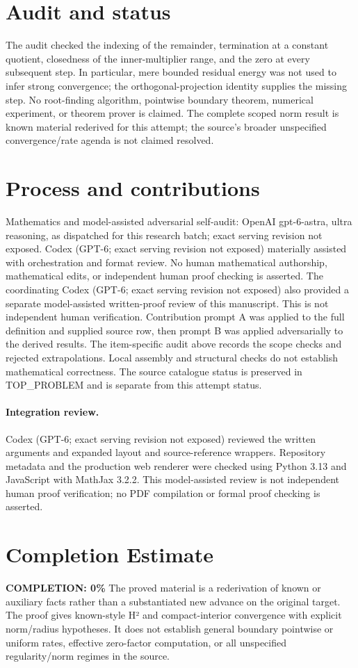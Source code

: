 \documentclass[11pt]{article}
\begin{document}
\section{Audit and status}
The audit checked the indexing of the remainder, termination at
a constant quotient, closedness of the inner-multiplier range,
and the zero at every subsequent step. In particular, mere
bounded residual energy was not used to infer strong convergence;
the orthogonal-projection identity supplies the missing step.
No root-finding algorithm, pointwise boundary theorem, numerical
experiment, or theorem prover is claimed. The complete scoped
norm result is known material rederived for this attempt; the
source's broader unspecified convergence/rate agenda is not
claimed resolved.

\section{Process and contributions}
Mathematics and model-assisted adversarial self-audit: OpenAI gpt-6-astra, ultra reasoning, as dispatched for this research batch; exact serving revision not exposed. Codex (GPT-6; exact serving revision not exposed) materially assisted with orchestration and format review. No human mathematical authorship, mathematical edits, or independent human proof checking is asserted.
The coordinating Codex (GPT-6; exact serving revision not exposed) also provided a separate model-assisted written-proof review of this manuscript. This is not independent human verification.
Contribution prompt A was applied to the full definition and supplied source row, then prompt B was applied adversarially to the derived results. The item-specific audit above records the scope checks and rejected extrapolations. Local assembly and structural checks do not establish mathematical correctness. The source catalogue status is preserved in TOP\_PROBLEM and is separate from this attempt status.
\paragraph{Integration review.} Codex (GPT-6; exact serving revision not exposed) reviewed the written arguments and expanded layout and source-reference wrappers. Repository metadata and the production web renderer were checked using Python 3.13 and JavaScript with MathJax 3.2.2. This model-assisted review is not independent human proof verification; no PDF compilation or formal proof checking is asserted.

\section{Completion Estimate}
\noindent\textbf{COMPLETION: 0\%}
The proved material is a rederivation of known or auxiliary facts rather than a substantiated new advance on the original target. The proof gives known-style H² and compact-interior convergence with explicit norm/radius hypotheses. It does not establish general boundary pointwise or uniform rates, effective zero-factor computation, or all unspecified regularity/norm regimes in the source.
\end{document}
